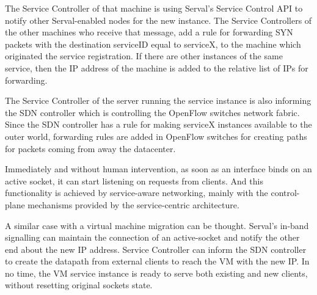 The Service Controller of that machine is using Serval's Service Control API to notify other Serval-enabled nodes for the new instance.
The Service Controllers of the other machines who receive that message, add a rule for forwarding SYN packets with the destination serviceID equal to serviceX, to the machine which originated the service registration.
If there are other instances of the same service, then the IP address of the machine is added to the relative list of IPs for forwarding.

The Service Controller of the server running the service instance is also informing the SDN controller which is controlling the OpenFlow switches network fabric.
Since the SDN controller has a rule for making serviceX instances available to the outer world, forwarding rules are added in OpenFlow switches for creating paths for packets coming from away the datacenter.

Immediately and without human intervention, as soon as an interface binds on an active socket, it can start listening on requests from clients.
And this functionality is achieved by service-aware networking, mainly with the control-plane mechanisms provided by the service-centric architecture.

A similar case with a virtual machine migration can be thought.
Serval's in-band signalling can maintain the connection of an active-socket and notify the other end about the new IP address.
Service Controller can inform the SDN controller to create the datapath from external clients to reach the VM with the new IP.
In no time, the VM service instance is ready to serve both existing and new clients, without resetting original sockets state.

\iffalse
\newpage
